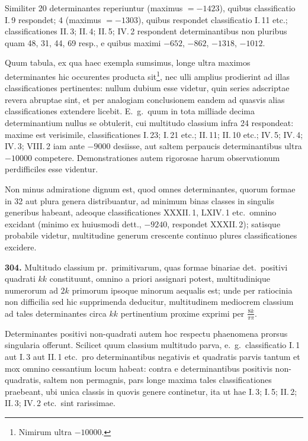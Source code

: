 \documentclass[12pt,a4paper]{article}
\theoremstyle{plain}
\theoremstyle{definition}
\theoremstyle{remark}
\begin{document}
Similiter 20 determinantes reperiuntur (maximus $= -1423$), quibus classificatio I.\,9 respondet; 4 (maximus $= -1303$), quibus respondet classificatio I.\,11 etc.; classificationes II.\,3; II.\,4; II.\,5; IV.\,2 respondent determinantibus non pluribus quam 48, 31, 44, 69 resp., e quibus maximi $-652$, $-862$, $-1318$, $-1012$.

Quum tabula, ex qua haec exempla sumsimus, longe ultra maximos determinantes hic occurentes producta sit\footnote{Nimirum ultra $-10000$.}, nec ulli amplius prodierint ad illas classificationes pertinentes: nullum dubium esse videtur, quin series adscriptae revera abruptae sint, et per analogiam conclusionem eandem ad quasvis alias classificationes extendere licebit. E.~g.~quum in tota milliade decima determinantium nullus se obtulerit, cui multitudo classium infra 24 respondeat: maxime est verisimile, classificationes I.\,23; I.\,21 etc.; II.\,11; II.\,10 etc.; IV.\,5; IV.\,4; IV.\,3; VIII.\,2 iam ante $-9000$ desiisse, aut saltem perpaucis determinantibus ultra $-10000$ competere. Demonstrationes autem rigorosae harum observationum perdifficiles esse videntur.

Non minus admiratione dignum est, quod omnes determinantes, quorum formae in 32 aut plura genera distribuantur, ad minimum binas classes in singulis generibus habeant, adeoque classificationes XXXII.\,1, LXIV.\,1 etc.~omnino excidant (minimo ex huiusmodi dett., $-9240$, respondet XXXII.\,2); satisque probabile videtur, multitudine generum crescente continuo plures classificationes excidere.

\textbf{304.} Multitudo classium pr.~primitivarum, quas formae binariae det.~positivi quadrati $kk$ constituunt, omnino a priori assignari potest, multitudinique numerorum ad $2k$ primorum ipsoque minorum aequalis est; unde per ratiocinia non difficilia sed hic supprimenda deducitur, multitudinem mediocrem classium ad tales determinantes circa $kk$ pertinentium proxime exprimi per $\tfrac{8k}{\pi\pi}$.

Determinantes positivi non-quadrati autem hoc respectu phaenomena prorsus singularia offerunt. Scilicet quum classium multitudo parva, e.~g.~classificatio I.\,1 aut I.\,3 aut II.\,1 etc.~pro determinantibus negativis et quadratis parvis tantum et mox omnino cessantium locum habeat: contra e determinantibus positivis non-quadratis, saltem non permagnis, pars longe maxima tales classificationes praebeant, ubi unica classis in quovis genere continetur, ita ut hae I.\,3; I.\,5; II.\,2; II.\,3; IV.\,2 etc.~sint rarissimae.
\end{document}
